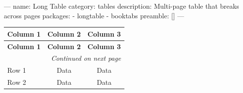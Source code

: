---
name: Long Table
category: tables
description: Multi-page table that breaks across pages
packages:
  - longtable
  - booktabs
preamble: []
---
\begin{longtable}{lcc}
\toprule
\textbf{Column 1} & \textbf{Column 2} & \textbf{Column 3} \\
\midrule
\endfirsthead

\toprule
\textbf{Column 1} & \textbf{Column 2} & \textbf{Column 3} \\
\midrule
\endhead

\midrule
\multicolumn{3}{r}{\textit{Continued on next page}} \\
\endfoot

\bottomrule
\endlastfoot

Row 1 & Data & Data \\
Row 2 & Data & Data \\
\end{longtable}
